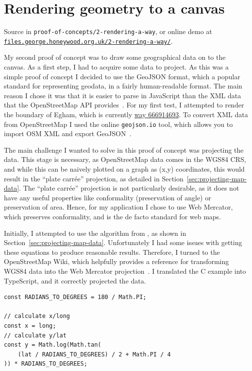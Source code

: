 \documentclass{final_report}
\begin{document}
\section{Rendering geometry to a canvas}

{ \footnotesize Source in \texttt{proof-of-concepts/2-rendering-a-way}, or online demo at \href{https://files.george.honeywood.org.uk/2-rendering-a-way/}{\nolinkurl{files.george.honeywood.org.uk/2-rendering-a-way/}}.}

My second proof of concept was to draw some geographical data on to the canvas. As a first step, I had to acquire some data to project. As this was a simple proof of concept I decided to use the GeoJSON format, which a popular standard for representing geodata, in a fairly human-readable format. The main reason I chose it was that it is easier to parse in JavaScript than the XML data that the OpenStreetMap API provides~\cite{osm-api-wiki}. For my first test, I attempted to render the boundary of Egham, which is currently \href{https://www.openstreetmap.org/way/666914693}{way 666914693}. To convert XML data from OpenStreetMap I used the online \texttt{geojson.io} tool, which allows you to import OSM XML and export GeoJSON~\cite{geojson.io}.

The main challenge I wanted to solve in this proof of concept was projecting the data. This stage is necessary, as OpenStreetMap data comes in the WGS84 CRS, and while this can be naively plotted on a graph as (x,y) coordinates, this would result in the ``plate carrée'' projection, as detailed in Section~\ref{sec:projecting-map-data}. The ``plate carrée'' projection is not particularly desirable, as it does not have any useful properties like conformality (preservation of angle) or preservation of area. Hence, for my application I chose to use Web Mercator, which preserves conformality, and is the de facto standard for web maps.

Initially, I attempted to use the algorithm from \textcite[41]{snyder1987map}, as shown in Section~\ref{sec:projecting-map-data}. Unfortunately I had some issues with getting these equations to produce reasonable results. Therefore, I turned to the OpenStreetMap Wiki, which helpfully provides a reference for transforming WGS84 data into the Web Mercator projection~\cite{osm-wiki-mercator}. I translated the C example into TypeScript, and it correctly projected the data.

\begin{lstlisting}[caption=Projecting to Web Mercator]
const RADIANS_TO_DEGREES = 180 / Math.PI;

// calculate x/long
const x = long;
// calculate y/lat
const y = Math.log(Math.tan(
    (lat / RADIANS_TO_DEGREES) / 2 + Math.PI / 4
)) * RADIANS_TO_DEGREES;
\end{lstlisting}
\end{document}
